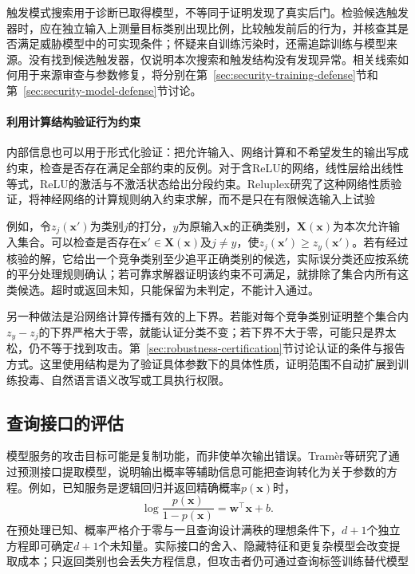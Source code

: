 触发模式搜索用于诊断已取得模型，不等同于证明发现了真实后门。检验候选触发器时，应在独立输入上测量目标类别出现比例，比较触发前后的行为，并核查其是否满足威胁模型中的可实现条件；怀疑来自训练污染时，还需追踪训练与模型来源。没有找到候选触发器，仅说明本次搜索和触发结构没有发现异常。相关线索如何用于来源审查与参数修复，将分别在第~\ref{sec:security-training-defense}节和第~\ref{sec:security-model-defense}节讨论。

\paragraph{利用计算结构验证行为约束}

内部信息也可以用于形式化验证：把允许输入、网络计算和不希望发生的输出写成约束，检查是否存在满足全部约束的反例。对于含ReLU的网络，线性层给出线性等式，ReLU的激活与不激活状态给出分段约束。Reluplex研究了这种网络性质验证，将神经网络的计算规则纳入约束求解，而不是只在有限候选输入上试验

例如，令$z_j(\bm{x}')$为类别$j$的打分，$y$为原输入$\bm{x}$的正确类别，$\bm X(\bm{x})$为本次允许输入集合。可以检查是否存在$\bm{x}'\in\bm X(\bm{x})$及$j\ne y$，使$z_j(\bm{x}')\geq z_y(\bm{x}')$。若有经过核验的解，它给出一个竞争类别至少追平正确类别的候选，实际误分类还应按系统的平分处理规则确认；若可靠求解器证明该约束不可满足，就排除了集合内所有这类候选。超时或返回未知，只能保留为未判定，不能计入通过。

另一种做法是沿网络计算传播有效的上下界。若能对每个竞争类别证明整个集合内$z_y-z_j$的下界严格大于零，就能认证分类不变；若下界不大于零，可能只是界太松，仍不等于找到攻击。第~\ref{sec:robustness-certification}节讨论认证的条件与报告方式。这里使用结构是为了验证具体参数下的具体性质，证明范围不自动扩展到训练投毒、自然语言语义改写或工具执行权限。

\subsection{查询接口的评估}
\label{sec:security-information-test}

模型服务的攻击目标可能是复制功能，而非使单次输出错误。Tramèr等研究了通过预测接口提取模型，说明输出概率等辅助信息可能把查询转化为关于参数的方程。例如，已知服务是逻辑回归并返回精确概率$p(\bm{x})$时，
\begin{equation}
 \log\frac{p(\bm{x})}{1-p(\bm{x})}
 =\bm{w}^{\top}\bm{x}+b.
 \label{eq:security-model-extraction}
\end{equation}
在预处理已知、概率严格介于零与一且查询设计满秩的理想条件下，$d+1$个独立方程即可确定$d+1$个未知量。实际接口的舍入、隐藏特征和更复杂模型会改变提取成本；只返回类别也会丢失方程信息，但攻击者仍可通过查询标签训练替代模型


